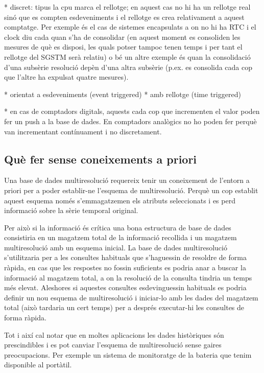 * discret: tipus la cpu marca el rellotge; en aquest cas no hi ha un rellotge real sinó que es compten esdeveniments i el rellotge es crea relativament a aquest comptatge. Per exemple és el cas de sistemes encapsulats a on no hi ha RTC i el clock diu cada quan s'ha de consolidar (en aquest moment es consoliden les mesures de què es disposi, les quals potser tampoc tenen temps i per tant el rellotge del SGSTM serà relatiu) o bé un altre exemple és quan la consolidació d'una subsèrie resolució depèn d'una altra subsèrie (p.ex. es consolida cada cop que l'altre ha expulsat quatre mesures).




\todo{}
* orientat a esdeveniments (event triggered)
* amb rellotge (time triggered)

* en cas de comptadors digitals, aquests cada cop que incrementen el valor poden fer un push a la base de dades. En comptadors analògics no ho poden fer perquè van incrementant contínuament i no discretament.

\subsection{Què fer sense coneixements a priori}

Una base de dades multiresolució requereix tenir un coneixement de l'entorn a priori per a poder establir-ne l'esquema de multiresolució. Perquè un cop establit aquest esquema només s'emmagatzemen els atributs seleccionats i es perd informació sobre la sèrie temporal original.

Per això si la informació és crítica una bona estructura de base de dades consistiria en un magatzem total de la informació recollida i un magatzem multiresolució amb un esquema inicial. La base de dades multiresolució s'utilitzaria per a les consultes habituals que s'haguessin de resoldre de forma ràpida, en cas que les respostes no fossin suficients es podria anar a buscar la informació al magatzem total, a on la resolució de la consulta tindria un temps més elevat. 
Aleshores si aquestes consultes esdevinguessin habituals es podria definir un nou esquema de multiresolució i iniciar-lo amb les dades del magatzem total (això tardaria un cert temps) per a després executar-hi les consultes de forma ràpida.


Tot i així cal notar que en moltes aplicacions les dades històriques
són prescindibles i es pot canviar l'esquema de multiresolució sense
gaires preocupacions. Per exemple un sistema de monitoratge de la
bateria que tenim disponible al portàtil.

